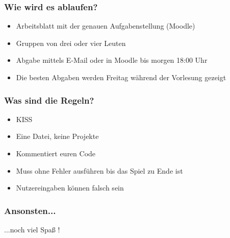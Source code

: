 \begin{frame}
    \frametitle{Wie wird es ablaufen?}
    \begin{itemize}
        \item Arbeitsblatt mit der genauen Aufgabenstellung (Moodle)
        \item Gruppen von drei oder vier Leuten
        \item Abgabe mittels E-Mail oder in Moodle bis morgen 18:00 Uhr
        \item Die besten Abgaben werden Freitag während der Vorlesung gezeigt
    \end{itemize}
\end{frame}

\begin{frame}
    \frametitle{Was sind die Regeln?}
    \begin{itemize}
        \item KISS
        \item Eine Datei, keine Projekte
        \item Kommentiert euren Code
        \item Muss ohne Fehler ausführen bis das Spiel zu Ende ist
        \item Nutzereingaben können falsch sein
    \end{itemize}
\end{frame}

\begin{frame}
    \frametitle{Ansonsten...}
    \vspace{15mm}
    \begin{center}
        \huge ...noch viel Spaß !
    \end{center}
\end{frame}

